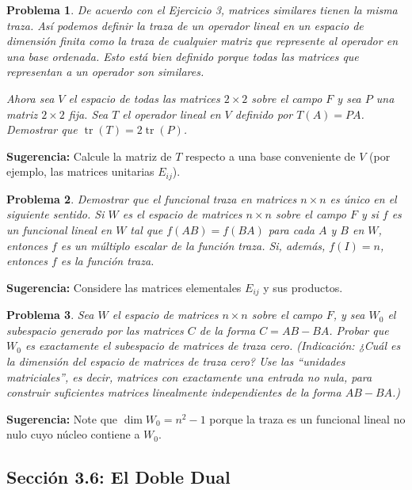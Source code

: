 \documentclass[12pt,a4paper]{article}
\newtheorem{problem}{Problema}
\newenvironment{suggestion}{\par\noindent\textbf{Sugerencia: }}{}
\begin{document}
\begin{problem}
De acuerdo con el Ejercicio 3, matrices similares tienen la misma traza. Así podemos definir la traza de un operador lineal en un espacio de dimensión finita como la traza de cualquier matriz que represente al operador en una base ordenada. Esto está bien definido porque todas las matrices que representan a un operador son similares.

Ahora sea $V$ el espacio de todas las matrices $2\times 2$ sobre el campo $F$ y sea $P$ una matriz $2\times 2$ fija. Sea $T$ el operador lineal en $V$ definido por $T(A)=PA$. Demostrar que $\operatorname{tr}(T)=2\operatorname{tr}(P)$.
\end{problem}
\begin{suggestion}
Calcule la matriz de $T$ respecto a una base conveniente de $V$ (por ejemplo, las matrices unitarias $E_{ij}$).
\end{suggestion}

\begin{problem}
Demostrar que el funcional traza en matrices $n\times n$ es único en el siguiente sentido. Si $W$ es el espacio de matrices $n\times n$ sobre el campo $F$ y si $f$ es un funcional lineal en $W$ tal que $f(AB)=f(BA)$ para cada $A$ y $B$ en $W$, entonces $f$ es un múltiplo escalar de la función traza. Si, además, $f(I)=n$, entonces $f$ es la función traza.
\end{problem}
\begin{suggestion}
Considere las matrices elementales $E_{ij}$ y sus productos.
\end{suggestion}

\begin{problem}
Sea $W$ el espacio de matrices $n\times n$ sobre el campo $F$, y sea $W_0$ el subespacio generado por las matrices $C$ de la forma $C=AB-BA$. Probar que $W_0$ es exactamente el subespacio de matrices de traza cero. (Indicación: ¿Cuál es la dimensión del espacio de matrices de traza cero? Use las ``unidades matriciales'', es decir, matrices con exactamente una entrada no nula, para construir suficientes matrices linealmente independientes de la forma $AB-BA$.)
\end{problem}
\begin{suggestion}
Note que $\dim W_0 = n^2-1$ porque la traza es un funcional lineal no nulo cuyo núcleo contiene a $W_0$.
\end{suggestion}

\subsection{Sección 3.6: El Doble Dual}
\end{document}

